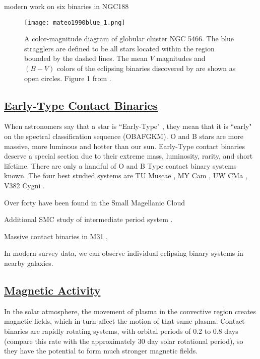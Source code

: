 \documentclass[12pt]{article} %
\numberwithin{equation}{section} %
\begin{document}
modern work on six binaries in NGC188 \citep{chen2016physical}

\begin{figure}[H]
\centering
\texttt{[image: mateo1990blue\_1.png]}
\caption{A color-magnitude diagram of globular cluster NGC 5466. The blue stragglers are defined to be all stars located within the region bounded by the dashed lines. The mean $V$ magnitudes and $(B - V)$ colors of the eclipsing binaries discovered by \citet{mateo1990blue} are shown as open circles. Figure 1 from \citet{mateo1990blue}.}
\label{fig: mateo1990blue_1}
\end{figure}

\subsection[Early-Type Contact Binaries]{\hyperlink{to}{Early-Type Contact Binaries}}

When astronomers say that a star is ``Early-Type" , they mean that it is ``early" on the spectral classification sequence (OBAFGKM). O and B stars are more massive, more luminous and hotter than our sun. Early-Type contact binaries deserve a special section due to their extreme mass, luminosity, rarity, and short lifetime. There are only a handful of O and B Type contact binary systems known. The four best studied systems are TU Muscae \citep{penny2008tomographic}, MY Cam \citep{lorenzo2014my}, UW CMa \citep{antokhina2011light}, V382 Cygni \citep{popper1978masses}. 

Over forty have been found in the Small Magellanic Cloud \citep{hilditch2005forty} 

Additional SMC study of intermediate period system \citep{priya2013photometric}.

Massive contact binaries in M31 \citep{lee2014properties}, \citep{vilardell2006eclipsing}

In modern survey data, we can observe individual eclipsing binary systems in nearby galaxies.


\subsection[Magnetic Activity]{\hyperlink{toc}{Magnetic Activity}}

In the solar atmosphere, the movement of plasma in the convective region creates magnetic fields, which in turn affect the motion of that same plasma. Contact binaries are rapidly rotating systems, with orbital periods of 0.2 to 0.8 days (compare this rate with the approximately 30 day solar rotational period), so they have the potential to form much stronger magnetic fields.
\end{document}
